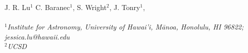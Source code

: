 J. R. Lu${}^1$
C. Baranec${}^1$,
S. Wright${}^2$,
J. Tonry${}^1$,
\\
\\
${}^1${\em Institute for Astronomy, University of Hawai'i, M\={a}noa,
    Honolulu, HI 96822; jessica.lu@hawaii.edu}
\\
${}^2${\em UCSD}
\\
